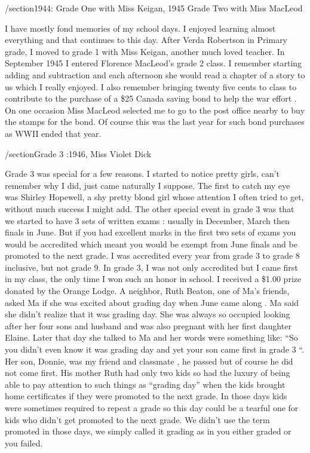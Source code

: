 /section{1944: Grade One with Miss Keigan, 1945 Grade Two with Miss MacLeod}

I have mostly fond memories of my school days. I enjoyed learning almost everything and that continues to this day. After Verda Robertson in Primary grade, I moved to grade 1 with Miss Keigan, another much loved teacher. In September 1945 I entered Florence MacLeod's grade 2 class. I remember starting adding and subtraction and each afternoon she would read a chapter of a story to us which I really enjoyed. I also remember bringing twenty five cents to class to contribute to the purchase of a \$25 Canada saving bond to help the war effort . On one occasion Miss MacLeod selected me to go to the post office nearby to buy the stamps for the bond. Of course this was the last year for such bond purchases as WWII ended that year.

/section{Grade 3 :1946, Miss Violet Dick}

Grade 3 was special for a few reasons. I started to notice pretty girls, can't remember why I did, just came naturally I suppose. The first to catch my eye was Shirley Hopewell, a shy pretty blond girl whose attention I often tried to get, without much success I might add. The other special event in grade 3 was that we started to have 3 sets of written exams : usually in December, March then finals in June. But if you had excellent marks in the first two sets of exams you would be accredited which meant you would be exempt from June finals and be promoted to the next grade. I was accredited every year from grade 3 to grade 8 inclusive, but not grade 9. In grade 3, I was not only accredited but I came first in my class, the only time I won such an honor in school. I received a \$1.00 prize donated by the Orange Lodge. A neighbor, Ruth Beaton, one of Ma's friends, asked Ma if she was excited about grading day when June came along . Ma said she didn't realize that it was grading day. She was always so occupied looking after her four sons and husband and was also pregnant with her first daughter Elaine. Later that day she talked to Ma and her words were something like: “So you didn't even know it was grading day and yet your son came first in grade 3 “. Her son, Donnie, was my friend and classmate , he passed but of course he did not come first. His mother Ruth had only two kids so had the luxury of being able to pay attention to such things as “grading day” when the kids brought home certificates if they were promoted to the next grade. In those days kids were sometimes required to repeat a grade so this day could be a tearful one for kids who didn't get promoted to the next grade. We didn't use the term promoted in those days, we simply called it grading as in you either graded or you failed.

